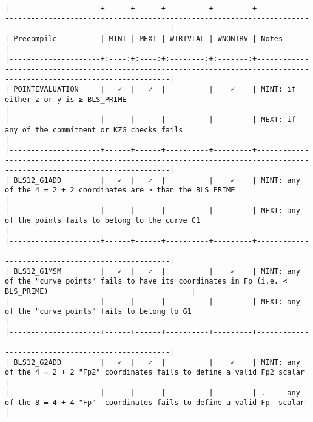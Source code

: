 \documentclass[varwidth=\maxdimen,margin=0.5cm,multi={verbatim}]{standalone}
\begin{document}
\begin{verbatim}

|---------------------+------+------+----------+---------+------------------------------------------------------------------------------------------------------------------------|
| Precompile          | MINT | MEXT | WTRIVIAL | WNONTRV | Notes                                                                                                                  |
|---------------------+:----:+:----:+:--------:+:-------:+------------------------------------------------------------------------------------------------------------------------|
| POINTEVALUATION     |   ✓  |   ✓  |          |    ✓    | MINT: if either z or y is ≥ BLS_PRIME                                                                                  |
|                     |      |      |          |         | MEXT: if any of the commitment or KZG checks fails                                                                     |
|---------------------+------+------+----------+---------+------------------------------------------------------------------------------------------------------------------------|
| BLS12_G1ADD         |   ✓  |   ✓  |          |    ✓    | MINT: any of the 4 = 2 + 2 coordinates are ≥ than the BLS_PRIME                                                        |
|                     |      |      |          |         | MEXT: any of the points fails to belong to the curve C1                                                                |
|---------------------+------+------+----------+---------+------------------------------------------------------------------------------------------------------------------------|
| BLS12_G1MSM         |   ✓  |   ✓  |          |    ✓    | MINT: any of the "curve points" fails to have its coordinates in Fp (i.e. < BLS_PRIME)                                 |
|                     |      |      |          |         | MEXT: any of the "curve points" fails to belong to G1                                                                  |
|---------------------+------+------+----------+---------+------------------------------------------------------------------------------------------------------------------------|
| BLS12_G2ADD         |   ✓  |   ✓  |          |    ✓    | MINT: any of the 4 = 2 + 2 "Fp2" coordinates fails to define a valid Fp2 scalar                                        |
|                     |      |      |          |         | .     any of the 8 = 4 + 4 "Fp"  coordinates fails to define a valid Fp  scalar                                        |

\end{verbatim}
\end{document}
